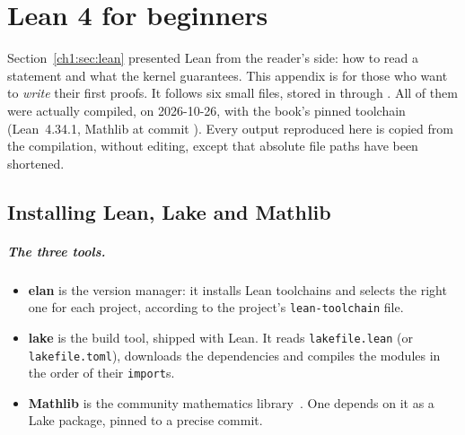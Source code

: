 \ifdefined\chemin\else
{}
\DeclareUrlCommand{}
\DeclareUrlCommand{}
\fi
\chapter{Lean 4 for beginners}\label{appC:chap}

Section~\ref{ch1:sec:lean} presented Lean from the reader's side: how to read a statement and what the kernel
guarantees. This appendix is for those who want to \emph{write} their first proofs. It follows six small files, stored
in  through . All of them were actually compiled,
on 2026-10-26, with the book's pinned toolchain (Lean~4.34.1, Mathlib at commit
). Every output reproduced here is copied from the compilation, without
editing, except that absolute file paths have been shortened.

\section{Installing Lean, Lake and Mathlib}\label{appC:sec:install}

\paragraph{The three tools.}
\begin{itemize}
\item \textbf{elan} is the version manager: it installs Lean toolchains and selects the right one for each project,
according to the project's \texttt{lean-toolchain} file.
\item \textbf{lake} is the build tool, shipped with Lean. It reads \texttt{lakefile.lean} (or
\texttt{lakefile.toml}), downloads the dependencies and compiles the modules in the order of their \texttt{import}s.
\item \textbf{Mathlib} is the community mathematics library~\cite{mathlib}. One depends on it as a Lake package,
pinned to a precise commit.
\end{itemize}

